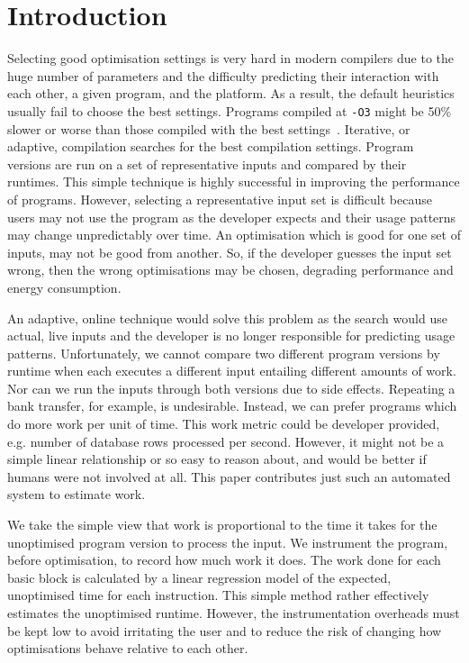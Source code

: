 \section{Introduction}

    Selecting good optimisation settings is very hard in modern compilers due to the huge number of parameters and the difficulty predicting their interaction with each other, a given program, and the platform. 
    As a result, the default heuristics usually fail to choose the best settings. 
    Programs compiled at \texttt{-O3} might be 50\% slower or worse than those compiled with the best settings~\cite{??}.
    Iterative, or adaptive, compilation searches for the best compilation settings. 
    Program versions are run on a set of representative inputs and compared by their runtimes.
    This simple technique is highly successful in improving the performance of programs.    
    However, selecting a representative input set is difficult because users may not use the program as the developer expects and their usage patterns may change unpredictably over time.
    An optimisation which is good for one set of inputs, may not be good from another. 
    So, if the developer guesses the input set wrong, then the wrong optimisations may be chosen, degrading performance and energy consumption.

    An adaptive, online technique would solve this problem as the search would use actual, live inputs and the developer is no longer responsible for predicting usage patterns. 
    Unfortunately, we cannot compare two different program versions by runtime when each executes a different input entailing different amounts of work.
    Nor can we run the inputs through both versions due to side effects. Repeating a bank transfer, for example, is undesirable.
    Instead, we can prefer programs which do more work per unit of time. 
    This work metric could be developer provided, e.g. number of database rows processed per second. 
    However, it might not be a simple linear relationship or so easy to reason about, and would be better if humans were not involved at all.    
    This paper contributes just such an automated system to estimate work.
    
    We take the simple view that work is proportional to the time it takes for the unoptimised program version to process the input.
    We instrument the program, before optimisation, to record how much work it does. 
    The work done for each basic block is calculated by a linear regression model of the expected, unoptimised time for each instruction.
    This simple method rather effectively estimates the unoptimised runtime.
    However, the instrumentation overheads must be kept low to avoid irritating the user and to reduce the risk of changing how optimisations behave relative to each other.

